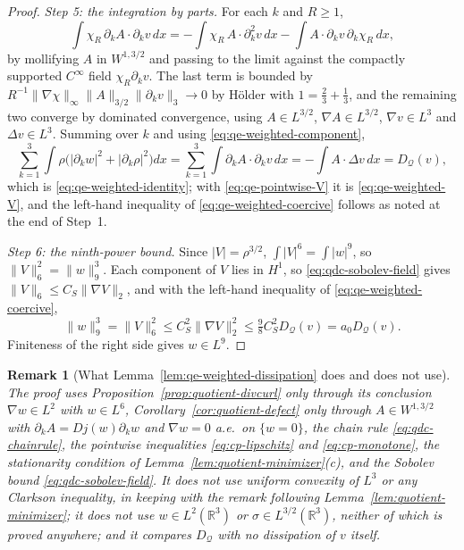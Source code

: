 \documentclass[11pt]{article}
\newtheorem{remark}[theorem]{Remark}
\theoremstyle{definition}
\theoremstyle{plain}
\newcommand{\R}{\mathbb R}
\newcommand{\norm}[1]{\lVert #1\rVert}
\begin{document}
\begin{proof}
\emph{Step 5: the integration by parts.}  For each $k$ and $R\ge1$,
\[
 \int\chi_R\,\partial_kA\cdot\partial_kv\,dx
 =-\int\chi_R\,A\cdot\partial_k^2v\,dx-\int A\cdot\partial_kv\,\partial_k\chi_R\,dx ,
\]
by mollifying $A$ in $W^{1,3/2}$ and passing to the limit against the
compactly supported $C^\infty$ field $\chi_R\partial_kv$.  The last term is
bounded by $R^{-1}\norm{\nabla\chi}_\infty\norm A_{3/2}\norm{\partial_kv}_3\to0$
by H\"older with $1=\frac23+\frac13$, and the remaining two converge by
dominated convergence, using $A\in L^{3/2}$, $\nabla A\in L^{3/2}$,
$\nabla v\in L^3$ and $\Delta v\in L^3$.  Summing over $k$ and using
\eqref{eq:qe-weighted-component},
\[
 \sum_{k=1}^3\int\rho\bigl(|\partial_kw|^2+|\partial_k\rho|^2\bigr)dx
 =\sum_{k=1}^3\int\partial_kA\cdot\partial_kv\,dx
 =-\int A\cdot\Delta v\,dx
 =D_{\mathcal Q}(v),
\]
which is \eqref{eq:qe-weighted-identity}; with \eqref{eq:qe-pointwise-V} it
is \eqref{eq:qe-weighted-V}, and the left-hand inequality of
\eqref{eq:qe-weighted-coercive} follows as noted at the end of Step~1.

\emph{Step 6: the ninth-power bound.}  Since $|V|=\rho^{3/2}$,
$\int|V|^6=\int|w|^9$, so $\norm V_6^2=\norm w_9^3$.  Each component of
$V$ lies in $H^1$, so \eqref{eq:qdc-sobolev-field} gives
$\norm V_6\le C_S\norm{\nabla V}_2$, and with the left-hand inequality of
\eqref{eq:qe-weighted-coercive},
\[
 \norm w_9^3=\norm V_6^2\le C_S^2\norm{\nabla V}_2^2
 \le\tfrac98C_S^2D_{\mathcal Q}(v)=a_0D_{\mathcal Q}(v).
\]
Finiteness of the right side gives $w\in L^9$.
\end{proof}

\begin{remark}[What Lemma~\ref{lem:qe-weighted-dissipation} does and does not use]
\label{rem:qe-weighted-scope}
The proof uses Proposition~\ref{prop:quotient-divcurl} only through its
conclusion $\nabla w\in L^2$ with $w\in L^6$, Corollary~\ref{cor:quotient-defect}
only through $A\in W^{1,3/2}$ with $\partial_kA=Dj(w)\partial_kw$ and
$\nabla w=0$ a.e.\ on $\{w=0\}$, the chain rule
\eqref{eq:qdc-chainrule}, the pointwise inequalities
\eqref{eq:cp-lipschitz} and \eqref{eq:cp-monotone}, the stationarity
condition of Lemma~\ref{lem:quotient-minimizer}(c), and the Sobolev bound
\eqref{eq:qdc-sobolev-field}.  It does not use uniform convexity of $L^3$
or any Clarkson inequality, in keeping with the remark following
Lemma~\ref{lem:quotient-minimizer}; it does not use $w\in L^2(\R^3)$ or
$\sigma\in L^{3/2}(\R^3)$, neither of which is proved anywhere; and it
compares $D_{\mathcal Q}$ with no dissipation of $v$ itself.
\end{remark}
\end{document}
